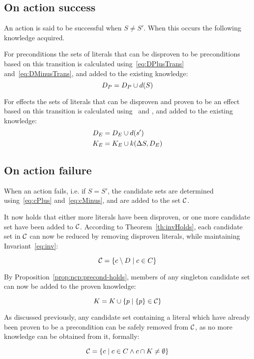 \documentclass[\master/Master.tex]{subfiles}
\begin{document}
\subsection*{On action success}
An action is said to be successful when $S \neq S'$. When this occurs the following knowledge acquired.

For preconditions the sets of literals that can be disproven to be preconditions based on this transition is calculated using~\eqref{eq:DPlusTrans} and~\eqref{eq:DMinusTrans}, and added to the existing knowledge:
\begin{equation*}
    D_P = D_P \cup d(S)
\end{equation*}

For effects the sets of literals that can be disproven and proven to be an effect based on this transition is calculated using~ and , and added to the existing knowledge:
\begin{align*}
D_E &= D_E \cup d(s') \\
K_E &= K_E \cup k(\Delta S, D_E)
\end{align*}


\subsection*{On action failure}

When an action fails, i.e. if $S = S'$, the candidate sets are determined using~\eqref{eq:cPlus} and~\eqref{eq:cMinus}, and are added to the set $\mathcal{C}$.

It now holds that either more literals have been disproven, or one more candidate set have been added to $\mathcal{C}$. According to Theorem~\ref{th:invHolds}, each candidate set in $\mathcal{C}$ can now be reduced by removing disproven literals, while maintaining Invariant~\eqref{eq:inv}:

\begin{equation} \label{reduceCands}
    \mathcal{C} = \left\{ c \setminus D \; | \; c \in C \right\}
\end{equation}

By Proposition~\ref{prop:ncp:precond-holds}, members of any singleton candidate set can now be added to the proven knowledge:

\begin{equation} \label{eq:extractKnown}
    K = K \cup \left\{ p \; | \; \{ p \} \in \mathcal{C} \right\}
\end{equation}

As discussed previously, any candidate set containing a literal which have already been proven to be a precondition can be safely removed from $\mathcal{C}$, as no more knowledge can be obtained from it, formally:


\begin{equation} \label{eq:removeKnown}
    \mathcal{C} = \left\{ c \; | \; c \in C \land c \cap K \neq \emptyset \right\}
\end{equation}
\end{document}
